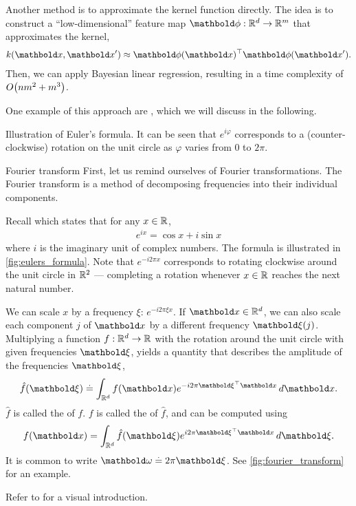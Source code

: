Another method is to approximate the kernel function directly.
The idea is to construct a ``low-dimensional'' feature map $\vphi : \R^d \to \R^m$ that approximates the kernel, \begin{align}
    k(\vx, \vxp) \approx \transpose{\vphi(\vx)} \vphi(\vxp).
\end{align}
Then, we can apply Bayesian linear regression, resulting in a time complexity of $\BigO{n m^2 + m^3}$.

One example of this approach are , which we will discuss in the following.

\begin{marginfigure}[25\baselineskip]
  \caption{Illustration of Euler's formula.
  It can be seen that $e^{i \varphi}$ corresponds to a (counter-clockwise) rotation on the unit circle as $\varphi$ varies from $0$ to $2 \pi$.}\label{fig:eulers_formula}
\end{marginfigure}

\begin{rmk}{Fourier transform}{}
  First, let us remind ourselves of Fourier transformations.
  The Fourier transform is a method of decomposing frequencies into their individual components.

  Recall  which states that for any $x \in \mathbb{R}$, \begin{align}
    e^{i x} = \cos x + i \sin x \label{eq:eulers_formula}
  \end{align} where $i$ is the imaginary unit of complex numbers.
  The formula is illustrated in \cref{fig:eulers_formula}.
  Note that $e^{- i 2 \pi x}$ corresponds to rotating clockwise around the unit circle in $\mathbb{R}^2$ --- completing a rotation whenever $x \in \mathbb{R}$ reaches the next natural number.

  We can scale $x$ by a frequency $\xi$: $e^{- i 2 \pi \xi x}$.
  If $\vx \in \R^d$, we can also scale each component $j$ of $\vx$ by a different frequency $\vxi(j)$.
  Multiplying a function $f : \mathbb{R}^d \to \mathbb{R}$ with the rotation around the unit circle with given frequencies $\vxi$, yields a quantity that describes the amplitude of the frequencies $\vxi$, \begin{align}
      \hat{f}(\vxi) \defeq \int_{\R^d} f(\vx) e^{- i 2 \pi \transpose{\vxi} \vx} \,d\vx. \label{eq:fourier_transform}
  \end{align}
  $\hat{f}$ is called the  of $f$.
  $f$ is called the  of $\hat{f}$, and can be computed using \begin{align}
    f(\vx) = \int_{\R^d} \hat{f}(\vxi) e^{i 2 \pi \transpose{\vxi} \vx} \,d\vxi.
  \end{align}
  It is common to write $\vomega \defeq 2\pi\vxi$.
  See \cref{fig:fourier_transform} for an example.

  Refer to  for a visual introduction.
\end{rmk}

